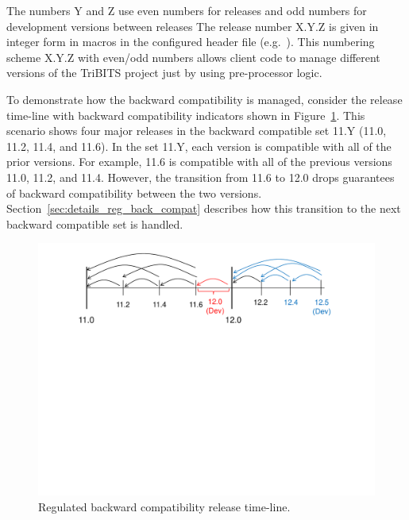 \documentclass[11pt]{SANDreport}
\begin{document}
The numbers Y and Z use even numbers for releases and odd numbers for development versions between releases
The release number X.Y.Z is given in integer form in macros in the configured header file {} (e.g.\ {}).  This numbering scheme X.Y.Z with even/odd numbers allows client code to manage different versions of the TriBITS project just by using pre-processor logic.

To demonstrate how the backward compatibility is managed, consider the release time-line with backward compatibility indicators shown in Figure~\ref{fig:BackwardCompatibilityTimeline}.  This scenario shows four major releases in the backward compatible set 11.Y (11.0, 11.2, 11.4, and 11.6).  In the set 11.Y, each version is compatible with all of the prior versions.  For example, 11.6 is compatible with all of the previous versions 11.0, 11.2, and 11.4.  However, the transition from 11.6 to 12.0 drops guarantees of backward compatibility between the two versions.  Section~\ref{sec:details_reg_back_compat} describes how this transition to the next backward compatible set is handled.

\begin{figure}
\begin{center}
\includegraphics[trim = 1.0in 5.0in 1.0in 0.2in, scale=0.55]
{BackwardCompatibilityTimeline}
{}\caption{Regulated backward compatibility release time-line.}
\label{fig:BackwardCompatibilityTimeline}
\end{center}
\end{figure}
\end{document}
